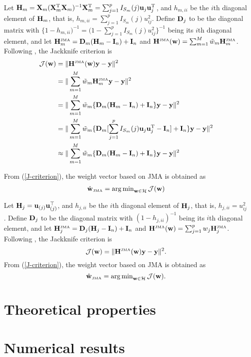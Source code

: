 \documentclass[12pt,hidelinks]{article}
\begin{document}
Let $\mathbf{H}_m=\mathbf{X}_m(\mathbf{X}_m^{\rm T}\mathbf{X}_m)^{-1}\mathbf{X}_m^{\rm T}=\sum_{j=1}^pI_{S_m}(j)\mathbf{u}_j\mathbf{u}_j^{\rm T}$, and $h_{m,ii}$ be the $i$th
diagonal element of $\mathbf{H}_m$, that is, $h_{m,ii}=\sum_{j=1}^pI_{S_m}(j)u_{ij}^2$.  Define
$\mathbf{D}_j$ to be the diagonal matrix with $\{1-h_{m,ii})^{-1}=(1-\sum_{j=1}^pI_{S_m}(j)u_{ij}^2\}^{-1}$ being its
$i$th diagonal element, and let
$\mathbf{H}^{\mbox{\tiny\rm JMA}}_{m} = \mathbf{D}_m(\mathbf{H}_m - \mathbf{I}_n) + \mathbf{I}_n$ and
$\mathbf{H}^{\mbox{\tiny\rm JMA}}(\mathbf{w})=\sum_{m=1}^M \tilde{w}_m\mathbf{H}^{\mbox{\tiny\rm JMA}}_m$.  Following \cite{Hansen:12},
the Jackknife criterion is
\begin{align}\label{J-criterion}
  {\cal J}(\mathbf{w})
  &=\|\mathbf{H}^{\mbox{\tiny\rm JMA}}(\mathbf{w})\mathbf{y}-\mathbf{y}\|^2\\
  &=\|\sum_{m=1}^M \tilde{w}_m\mathbf{H}^{\mbox{\tiny\rm JMA}}_m\mathbf{y}-\mathbf{y}\|^2\\
  &=\|\sum_{m=1}^M \tilde{w}_m\{\mathbf{D}_m(\mathbf{H}_m - \mathbf{I}_n) + \mathbf{I}_n\}\mathbf{y}-\mathbf{y}\|^2\\
  &=\|\sum_{m=1}^M \tilde{w}_m\{\mathbf{D}_m[\sum_{j=1}^pI_{S_m}(j)\mathbf{u}_j\mathbf{u}_j^{\rm T} - \mathbf{I}_n] + \mathbf{I}_n\}\mathbf{y}-\mathbf{y}\|^2\\
  &\approx\|\sum_{m=1}^M \tilde{w}_m\{\mathbf{D}_m(\mathbf{H}_m - \mathbf{I}_n) + \mathbf{I}_n\}\mathbf{y}-\mathbf{y}\|^2\\
\end{align}

From (\ref{J-criterion}), the weight vector based on JMA is obtained as
\begin{align*}
  \hat{\mathbf{w}}_{{\mbox{\tiny\rm JMA}}}
  =\mathop{\arg\min}\nolimits_{\mathbf{w}\in\mathcal{H}}{{\cal J}}(\mathbf{w})
\end{align*}

Let $\mathbf{H}_j=\mathbf{u}_{(j)}\mathbf{u}_{(j)}^{\top}$, and
$h_{j,ii}$ be the $i$th diagonal element of $\mathbf{H}_j$, that is, $h_{j,ii}=u_{ij}^2$.
Define $\mathbf{D}_j$ to be the diagonal matrix with $(1-h_{j,ii})^{-1}$ being its $i$th diagonal element, and let
$\mathbf{H}^{\mbox{\tiny\rm JMA}}_{j} = \mathbf{D}_j(\mathbf{H}_j - \mathbf{I}_n) + \mathbf{I}_n$
and
 $\mathbf{H}^{\mbox{\tiny\rm JMA}}(\mathbf{w})=\sum_{j=1}^p w_j\mathbf{H}^{\mbox{\tiny\rm JMA}}_j$.
Following \cite{Hansen:12}, the Jackknife criterion is
\begin{equation}\label{J-criterion}
{\cal J}(\mathbf{w})=\|\mathbf{H}^{\mbox{\tiny\rm JMA}}(\mathbf{w})\mathbf{y}-\mathbf{y}\|^2.
\end{equation}
From (\ref{J-criterion}), the weight vector based on JMA is obtained as
\begin{equation*}
  \hat{\mathbf{w}}_{{\mbox{\tiny\rm JMA}}}
  =\mathop{\arg\min}\nolimits_{\mathbf{w}\in\mathcal{H}}{{\cal J}}(\mathbf{w}).
\end{equation*}

\section{Theoretical properties}

\section{Numerical results}



\end{document}
